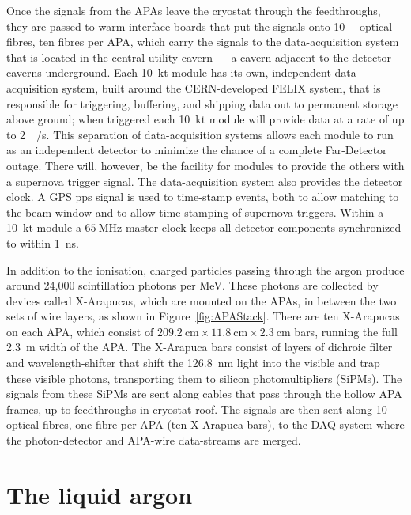 Once the signals from the APAs leave the cryostat through the feedthroughs, they are passed to warm interface boards that put the signals onto \SI{10}{\giga\byte} optical fibres, ten fibres per APA, which carry the signals to the data-acquisition system that is located in the central utility cavern --- a cavern adjacent to the detector caverns underground. Each \SI{10}{\kilo\tonne} module has its own, independent data-acquisition system, built around the CERN-developed FELIX system, that is responsible for triggering, buffering, and shipping data out to permanent storage above ground; when triggered each \SI{10}{\kilo\tonne} module will provide data at a rate of up to \SI{2}{\tera\byte/\second}. This separation of data-acquisition systems allows each module to run as an independent detector to minimize the chance of a complete Far-Detector outage. There will, however, be the facility for modules to provide the others with a supernova trigger signal. The data-acquisition system also provides the detector clock. A GPS pps signal is used to time-stamp events, both to allow matching to the beam window and to allow time-stamping of supernova triggers. Within a \SI{10}{\kilo\tonne} module a $\SI{65}{\mega\hertz}$ master clock keeps all detector components synchronized to within \SI{1}{\nano\second}.

In addition to the ionisation, charged particles passing through the argon produce around 24,000 scintillation photons per \si{\mega\electronvolt}. These photons are collected by devices called X-Arapucas, which are mounted on the APAs, in between the two sets of wire layers, as shown in Figure~\ref{fig:APAStack}. There are ten X-Arapucas on each APA, which consist of $\SI{209.2}{\cm}\times\SI{11.8}{\cm}\times\SI{2.3}{\cm}$ bars, running the full \SI{2.3}{\meter} width of the APA. The X-Arapuca bars consist of layers of dichroic filter and wavelength-shifter that shift the \SI{126.8}{\nano\meter} light into the visible and trap these visible photons, transporting them to silicon photomultipliers (SiPMs). The signals from these SiPMs are sent along cables that pass through the hollow APA frames, up to feedthroughs in cryostat roof. The signals are then sent along \SI{10}{\giga\byte} optical fibres, one fibre per APA (ten X-Arapuca bars), to the DAQ system where the photon-detector and APA-wire data-streams are merged.

\section{The liquid argon}
\label{sec:fdsp-exec-liquidargon}


